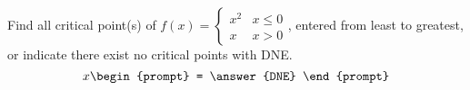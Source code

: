 \documentclass{ximera}
\author{Gregory Hartman \and Matthew Carr}
\begin{document}
\begin{exercise}




Find all critical point(s) of $f(x)= \left\{\begin{array}{cc} x^2 & x\leq 0 \\ x & x> 0 \end{array} \right.$, entered from least to greatest, or indicate there exist no critical points with DNE.
\[
x
\begin{prompt}
= \answer{DNE}
\end{prompt}
\]


\end{exercise}
\end{document}
